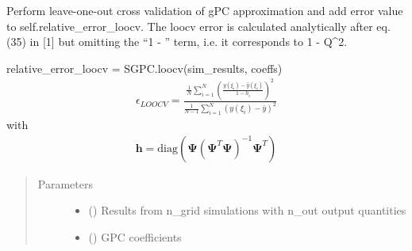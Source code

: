 \documentclass[letterpaper,10pt,english,openany,oneside]{sphinxmanual}
\begin{document}
\begin{fulllineitems}
\begin{fulllineitems}
\begin{quote}
\begin{description}
\end{description}\end{quote}

\end{fulllineitems}


\begin{fulllineitems}
\label{\detokenize{pygpc:pygpc.SGPC.Reg.loocv}}
Perform leave-one-out cross validation of gPC approximation and add error value to self.relative\_error\_loocv.
The loocv error is calculated analytically after eq. (35) in {[}1{]} but omitting the “1 - ” term, i.e. it
corresponds to 1 - Q\textasciicircum{}2.

relative\_error\_loocv = SGPC.loocv(sim\_results, coeffs)
\begin{equation*}
\begin{split}\epsilon_{LOOCV} = \frac{\frac{1}{N}\sum_{i=1}^N \left( \frac{y(\xi_i) - \hat{y}(\xi_i)}{1-h_i} \right)^2}{\frac{1}{N-1}\sum_{i=1}^N \left( y(\xi_i) - \bar{y} \right)^2}\end{split}
\end{equation*}
with
\begin{equation*}
\begin{split}\mathbf{h} = \mathrm{diag}(\mathbf{\Psi} (\mathbf{\Psi}^T \mathbf{\Psi})^{-1} \mathbf{\Psi}^T)\end{split}
\end{equation*}\begin{quote}\begin{description}
\item[{Parameters}] \leavevmode\begin{itemize}
\item {} 
 (\sphinxstyleliteralemphasis{\sphinxupquote{ {[}}}\sphinxstyleliteralemphasis{\sphinxupquote{{]}}}) \textendash{} Results from n\_grid simulations with n\_out output quantities

\item {} 
 (\sphinxstyleliteralemphasis{\sphinxupquote{ {[}}}\sphinxstyleliteralemphasis{\sphinxupquote{{]}}}) \textendash{} GPC coefficients


\end{itemize}
\end{description}
\end{quote}
\end{fulllineitems}
\end{fulllineitems}
\end{document}
